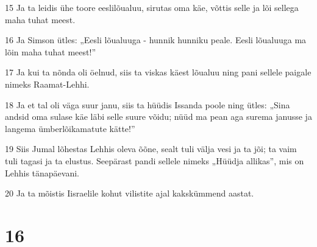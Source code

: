\par 15 Ja ta leidis ühe toore eeslilõualuu, sirutas oma käe, võttis selle ja lõi sellega maha tuhat meest.
\par 16 Ja Simson ütles: „Eesli lõualuuga - hunnik hunniku peale. Eesli lõualuuga ma lõin maha tuhat meest!”
\par 17 Ja kui ta nõnda oli öelnud, siis ta viskas käest lõualuu ning pani sellele paigale nimeks Raamat-Lehhi.
\par 18 Ja et tal oli väga suur janu, siis ta hüüdis Issanda poole ning ütles: „Sina andsid oma sulase käe läbi selle suure võidu; nüüd ma pean aga surema janusse ja langema ümberlõikamatute kätte!”
\par 19 Siis Jumal lõhestas Lehhis oleva õõne, sealt tuli välja vesi ja ta jõi; ta vaim tuli tagasi ja ta elustus. Seepärast pandi sellele nimeks „Hüüdja allikas”, mis on Lehhis tänapäevani.
\par 20 Ja ta mõistis Iisraelile kohut vilistite ajal kakskümmend aastat.

\chapter{16}

